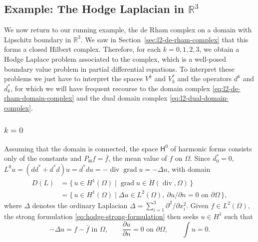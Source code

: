 \subsection{{Example: The Hodge Laplacian in $\mathbb R^3$}}\label{sec:hodge-r3}

{We now return to our running example, the de Rham complex on a domain with Lipschitz boundary in $\mathbb R^3$. We saw in Section~\ref{sec:l2-de-rham-complex} that this forms a closed Hilbert complex. Therefore, for each $k=0,1,2,3$, we obtain a Hodge Laplace problem associated to the complex, which is a well-posed boundary value problem in partial differential equations. To interpret these problems we just have to interpret the spaces $V^k$ and $V_k^*$ and the operators $d^k$ and $d_k^*$, for which we will have frequent recourse to the domain complex \eqref{eq:l2-de-rham-domain-complex} and the dual domain complex \eqref{eq:l2-dual-domain-complex}.}

\subsubsection{$k=0$}\label{subsec:hodge-r3-k0}

{Assuming that the domain is connected, the space $\mathsf H^0$ of harmonic forms consists only of the constants and $P_{\mathsf H}f=\bar f$, the mean value of $f$ on $\Omega$. Since $d_0^*=0$, $L^0u=(dd^*+d^*d)u=d^*du=-\operatorname{div}\operatorname{grad}u=-\Delta u$, with domain}
\[
\begin{aligned}
D(L)&=\{\,u\in H^1(\Omega)\mid\operatorname{grad}u\in\mathring H(\operatorname{div},\Omega)\,\}\\
&=\{\,u\in H^1(\Omega)\mid\Delta u\in L^2(\Omega),\ \partial u/\partial n=0\text{ on }\partial\Omega\,\},
\end{aligned}
\]
{where $\Delta$ denotes the ordinary Laplacian $\Delta=\sum_{i=1}^3\partial^2/\partial x_i^2$. Given $f\in L^2(\Omega)$, the strong formulation \eqref{eq:hodge-strong-formulation} then seeks $u\in H^1$ such that}
\begin{equation}\label{eq:hodge-r3-neumann-strong}
-\Delta u=f-\bar f\text{ in }\Omega,\qquad\frac{\partial u}{\partial n}=0\text{ on }\partial\Omega,\qquad\int u=0.
\end{equation}

